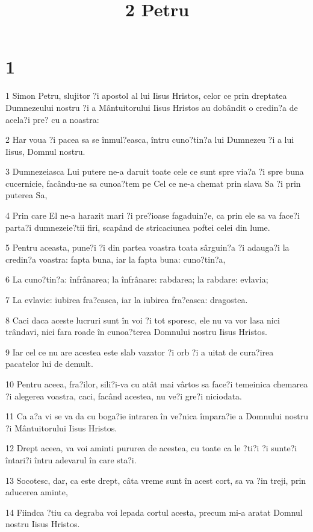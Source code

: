 

\title{2 Petru}


\chapter{1}

\par 1 Simon Petru, slujitor ?i apostol al lui Iisus Hristos, celor ce prin dreptatea Dumnezeului nostru ?i a Mântuitorului Iisus Hristos au dobândit o credin?a de acela?i pre? cu a noastra:
\par 2 Har voua ?i pacea sa se înmul?easca, întru cuno?tin?a lui Dumnezeu ?i a lui Iisus, Domnul nostru.
\par 3 Dumnezeiasca Lui putere ne-a daruit toate cele ce sunt spre via?a ?i spre buna cucernicie, facându-ne sa cunoa?tem pe Cel ce ne-a chemat prin slava Sa ?i prin puterea Sa,
\par 4 Prin care El ne-a harazit mari ?i pre?ioase fagaduin?e, ca prin ele sa va face?i parta?i dumnezeie?tii firi, scapând de stricaciunea poftei celei din lume.
\par 5 Pentru aceasta, pune?i ?i din partea voastra toata sârguin?a ?i adauga?i la credin?a voastra: fapta buna, iar la fapta buna: cuno?tin?a,
\par 6 La cuno?tin?a: înfrânarea; la înfrânare: rabdarea; la rabdare: evlavia;
\par 7 La evlavie: iubirea fra?easca, iar la iubirea fra?easca: dragostea.
\par 8 Caci daca aceste lucruri sunt în voi ?i tot sporesc, ele nu va vor lasa nici trândavi, nici fara roade în cunoa?terea Domnului nostru Iisus Hristos.
\par 9 Iar cel ce nu are acestea este slab vazator ?i orb ?i a uitat de cura?irea pacatelor lui de demult.
\par 10 Pentru aceea, fra?ilor, sili?i-va cu atât mai vârtos sa face?i temeinica chemarea ?i alegerea voastra, caci, facând acestea, nu ve?i gre?i niciodata.
\par 11 Ca a?a vi se va da cu boga?ie intrarea în ve?nica împara?ie a Domnului nostru ?i Mântuitorului Iisus Hristos.
\par 12 Drept aceea, va voi aminti pururea de acestea, cu toate ca le ?ti?i ?i sunte?i întari?i întru adevarul în care sta?i.
\par 13 Socotesc, dar, ca este drept, câta vreme sunt în acest cort, sa va ?in treji, prin aducerea aminte,
\par 14 Fiindca ?tiu ca degraba voi lepada cortul acesta, precum mi-a aratat Domnul nostru Iisus Hristos.
